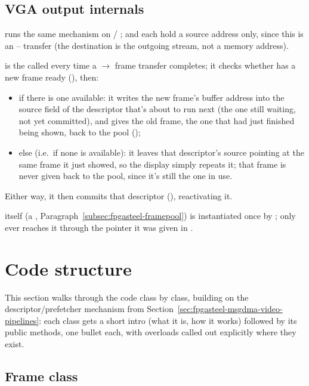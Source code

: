 \subsection{VGA output internals}
\label{subsec:fpgasteel-vga-output-interrupt}

 runs the same mechanism on  / ;  and  each hold a source address only, since this is an -- transfer (the destination is the outgoing  stream, not a memory address).

 is the  called every time a $\rightarrow$  frame transfer completes; it checks whether  has a new frame ready (), then:
\begin{itemize}
    \item if there is one available: it writes the new frame's buffer address into the source field of the descriptor that's about to run next (the one still waiting, not yet committed), and gives the old frame, the one that had just finished being shown, back to the pool ();
    \item else (i.e.\ if none is available): it leaves that descriptor's source pointing at the same frame it just showed, so the display simply repeats it; that frame is never given back to the pool, since it's still the one in use.
\end{itemize}
Either way, it then commits that descriptor (), reactivating it.

 itself (a , Paragraph~\ref{subsec:fpgasteel-framepool}) is instantiated once by ;  only ever reaches it through the pointer it was given in .

\section{Code structure}
\label{sec:fpgasteel-code-structure}

This section walks through the code class by class, building on the descriptor/prefetcher mechanism from Section~\ref{sec:fpgasteel-msgdma-video-pipelines}: each class gets a short intro (what it is, how it works) followed by its public methods, one bullet each, with overloads called out explicitly where they exist.

\subsection{Frame class}
\label{subsec:fpgasteel-frame-class}

